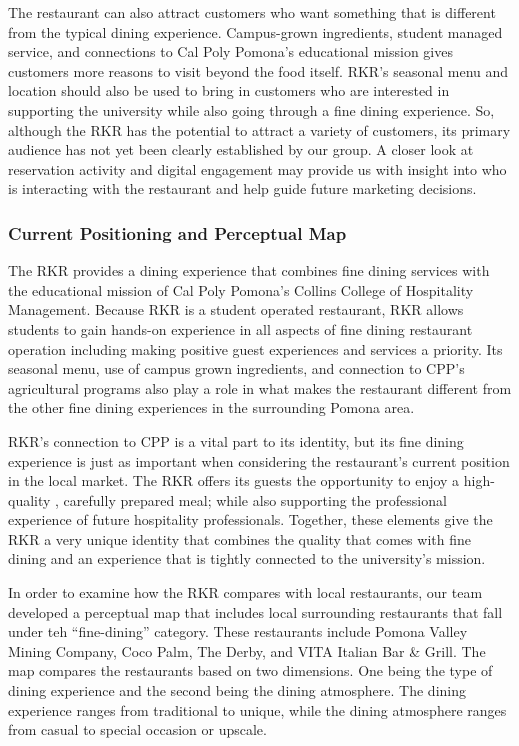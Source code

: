\documentclass[
  12pt,
  letterpaper,
  DIV=11,
  numbers=noendperiod]{scrartcl}
\begin{document}
The restaurant can also attract customers who want something that is
different from the typical dining experience. Campus-grown ingredients,
student managed service, and connections to Cal Poly Pomona's
educational mission gives customers more reasons to visit beyond the
food itself. RKR's seasonal menu and location should also be used to
bring in customers who are interested in supporting the university while
also going through a fine dining experience. So, although the RKR has
the potential to attract a variety of customers, its primary audience
has not yet been clearly established by our group. A closer look at
reservation activity and digital engagement may provide us with insight
into who is interacting with the restaurant and help guide future
marketing decisions.

\subsubsection{Current Positioning and Perceptual
Map}\label{current-positioning-and-perceptual-map}

The RKR provides a dining experience that combines fine dining services
with the educational mission of Cal Poly Pomona's Collins College of
Hospitality Management. Because RKR is a student operated restaurant,
RKR allows students to gain hands-on experience in all aspects of fine
dining restaurant operation including making positive guest experiences
and services a priority. Its seasonal menu, use of campus grown
ingredients, and connection to CPP's agricultural programs also play a
role in what makes the restaurant different from the other fine dining
experiences in the surrounding Pomona area.~

RKR's connection to CPP is a vital part to its identity, but its fine
dining experience is just as important when considering the restaurant's
current position in the local market. The RKR offers its guests the
opportunity to enjoy a high-quality , carefully prepared meal; while
also supporting the professional experience of future hospitality
professionals. Together, these elements give the RKR a very unique
identity that combines the quality that comes with fine dining and an
experience that is tightly connected to the university's mission.~

In order to examine how the RKR compares with local restaurants, our
team developed a perceptual map that includes local surrounding
restaurants that fall under teh ``fine-dining'' category. These
restaurants include Pomona Valley Mining Company, Coco Palm, The Derby,
and VITA Italian Bar \& Grill. The map compares the restaurants based on
two dimensions. One being the type of dining experience and the second
being the dining atmosphere. The dining experience ranges from
traditional to unique, while the dining atmosphere ranges from casual to
special occasion or upscale.~
\end{document}
